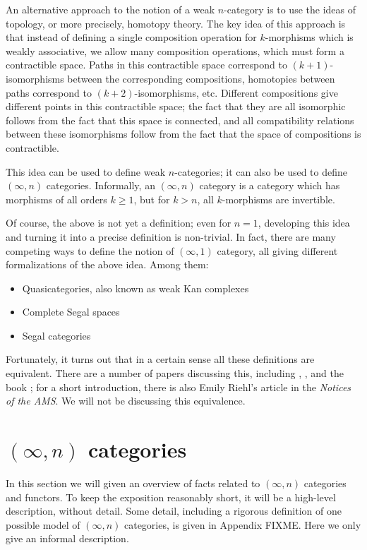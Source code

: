 An alternative approach to the notion of a weak $n$-category is to use the
ideas of topology, or more precisely, homotopy theory. The key idea of this
approach is that instead of defining a single composition operation for
$k$-morphisms which is weakly associative, we allow many composition
operations, which must form a contractible space. Paths in this contractible
space correspond to $(k+1)$-isomorphisms between the corresponding
compositions, homotopies between paths correspond to $(k+2)$-isomorphisms, etc.
Different compositions give different points in this contractible space; the
fact that they are all isomorphic follows from the fact that this space is
connected, and all compatibility relations between these isomorphisms follow
from the fact that the space of compositions is contractible.

This idea can be used to define weak $n$-categories; it can also be used to
define $(\infty, n)$ categories. Informally, an $(\infty, n)$ category is a
category which has morphisms of all orders $k \ge 1$, but for $k>n$, all
$k$-morphisms are invertible.


Of course, the above is not yet a definition; even for $n=1$, developing this
idea and turning it into a precise definition is non-trivial. In fact, there are
many competing ways to define the notion of $(\infty, 1)$ category, all giving
different formalizations of the above idea. Among them:

\begin{itemize}
  \item Quasicategories, also known as weak Kan complexes
  \item Complete Segal spaces
  \item Segal categories
\end{itemize}

Fortunately, it turns out that in a certain sense all these definitions are
equivalent. There are a number of papers discussing this, including
\cite{toen}, \cite{bsp}, and the book \cite{riehl-verity}; for a short
introduction, there is also Emily Riehl's article \cite{riehl-notices} in the
\emph{Notices of the AMS}. We will not be discussing this equivalence.


\section{$(\infty, n)$ categories}\label{auto:c14-higher-cat-categories}
In this section we will given an overview of facts related to $(\infty, n)$
categories and functors. To keep the exposition reasonably short, it will be a
high-level description, without detail. Some detail, including a rigorous
definition of one possible model of $(\infty, n)$ categories, is given in
Appendix FIXME. Here we only give an informal description.

